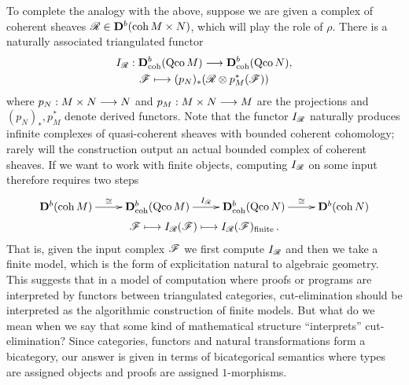 \documentclass[english,letter paper,12pt,reqno]{article}
\theoremstyle{example}
\numberwithin{equation}{section}
\begin{document}
To complete the analogy with the above, suppose we are given a complex of coherent sheaves $\mathscr{R} \in \mathbf{D}^b(\operatorname{coh} M \times N)$, which will play the role of $\rho$. There is a naturally associated triangulated functor
\begin{gather}\label{eq:infinite_functor}
I_{\mathscr{R}}: \mathbf{D}^b_{\operatorname{coh}}(\operatorname{Qco} M) \longrightarrow \mathbf{D}^b_{\operatorname{coh}}(\operatorname{Qco} N),\\
\mathscr{F} \longmapsto (p_N)_*( \mathscr{R} \otimes p_M^*( \mathscr{F} ))
\end{gather}
where $p_N: M \times N \longrightarrow N$ and $p_M: M \times N \longrightarrow M$ are the projections and $(p_N)_*, p^*_M$ denote derived functors. Note that the functor $I_{\mathscr{R}}$ naturally produces infinite complexes of quasi-coherent sheaves with bounded coherent cohomology; rarely will the construction output an actual bounded complex of coherent sheaves. If we want to work with finite objects, computing $I_{\mathscr{R}}$ on some input therefore requires two steps
\begin{gather}\label{eq:step_by_step}
\xymatrix{
\mathbf{D}^b(\operatorname{coh} M) \ar[r]^-{\cong} & \mathbf{D}^b_{\operatorname{coh}}(\operatorname{Qco} M) \ar[r]^-{I_{\md{R}}} & \mathbf{D}^b_{\operatorname{coh}}(\operatorname{Qco} N) \ar[r]^-{\cong} & \mathbf{D}^b(\operatorname{coh} N)
}\\
\md{F} \longmapsto I_{\md{R}}(\md{F}) \longmapsto I_{\md{R}}(\md{F})_{\operatorname{finite}}\,.
\end{gather}
That is, given the input complex $\mathscr{F}$ we first compute $I_{\mathscr{R}}$ and then we take a finite model, which is the form of explicitation natural to algebraic geometry.
\\

This suggests that in a model of computation where proofs or programs are interpreted by functors between triangulated categories, cut-elimination should be interpreted as the algorithmic construction of finite models. But what do we mean when we say that some kind of mathematical structure ``interprets'' cut-elimination? Since categories, functors and natural transformations form a bicategory, our answer is given in terms of bicategorical semantics where types are assigned objects and proofs are assigned $1$-morphisms. 
\end{document}
